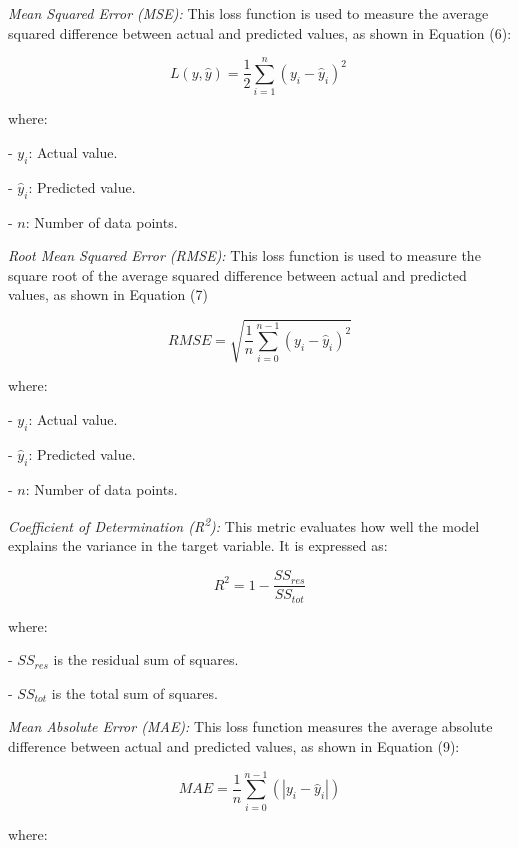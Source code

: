\begin{multicols}{2}
\emph{Mean Squared Error (MSE):} This loss function is used to measure
the average squared difference between actual and predicted values, as
shown in Equation (6):

\begin{equation}
L\left( y,\widehat{y} \right) = \frac{1}{2}\sum_{i = 1}^{n}{{(y_{i} - {\widehat{y}}_{i})}^{2}\ }
\end{equation}

where:

- \(y_{i}\): Actual value.

- \({\widehat{y}}_{i}\): Predicted value.

- \(n\): Number of data points.

\emph{Root Mean Squared Error (RMSE):} This loss function is used to
measure the square root of the average squared difference between actual
and predicted values, as shown in Equation (7)

\begin{equation}
RMSE = \sqrt{\frac{1}{n}\sum_{i = 0}^{n - 1}{(y_{i} - {\widehat{y}}_{i})}^{2}}
\end{equation}

where:

- \(y_{i}\): Actual value.

- \({\widehat{y}}_{i}\)\hspace{0pt}: Predicted value.

- \(n\): Number of data points.

\emph{Coefficient of Determination (R\textsuperscript{2}):} This metric
evaluates how well the model explains the variance in the target
variable. It is expressed as:

\begin{equation}
R^{2} = 1 - \frac{{SS}_{res}}{{SS}_{tot}}
\end{equation}

where:

- \({SS}_{res}\) is the residual sum of squares.

- \({SS}_{tot}\) is the total sum of squares.

\emph{Mean Absolute Error (MAE):} This loss function measures the
average absolute difference between actual and predicted values, as
shown in Equation (9):

\begin{equation}
MAE = \frac{1}{n}\sum_{i = 0}^{n - 1}{(|y_{i} - {\widehat{y}}_{i}|)}
\end{equation}

where:


\end{multicols}
